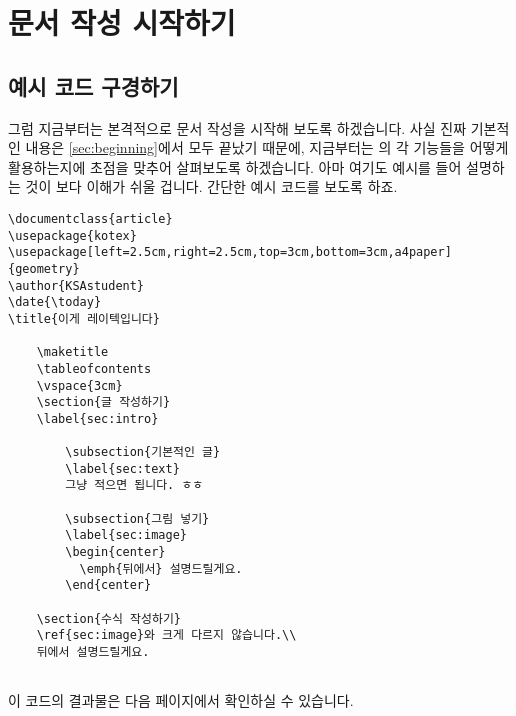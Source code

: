 
\newpage
\section{문서 작성 시작하기}
\label{sec:text}
\subsection{예시 코드 구경하기}
그럼 지금부터는 본격적으로 문서 작성을 시작해 보도록 하겠습니다.
사실 진짜 기본적인 내용은 \ref{sec:beginning}에서 모두 끝났기 때문에, 지금부터는 \lt 의 각 기능들을 어떻게 활용하는지에 초점을 맞추어 살펴보도록 하겠습니다. 아마 여기도 예시를 들어 설명하는 것이 보다 이해가 쉬울 겁니다. 간단한 예시 코드를 보도록 하죠.
\begin{Verbatim}[frame=single]
\documentclass{article}
\usepackage{kotex}
\usepackage[left=2.5cm,right=2.5cm,top=3cm,bottom=3cm,a4paper]{geometry}
\author{KSAstudent}
\date{\today}
\title{이게 레이텍입니다}

    \maketitle
    \tableofcontents
    \vspace{3cm}
    \section{글 작성하기}
    \label{sec:intro}

        \subsection{기본적인 글}
        \label{sec:text}
        그냥 적으면 됩니다. ㅎㅎ
        
        \subsection{그림 넣기}
        \label{sec:image}
        \begin{center}
          \emph{뒤에서} 설명드릴게요.
        \end{center}

    \section{수식 작성하기}
    \ref{sec:image}와 크게 다르지 않습니다.\\
    뒤에서 설명드릴게요.


\end{Verbatim}
이 코드의 결과물은 다음 페이지에서 확인하실 수 있습니다.

